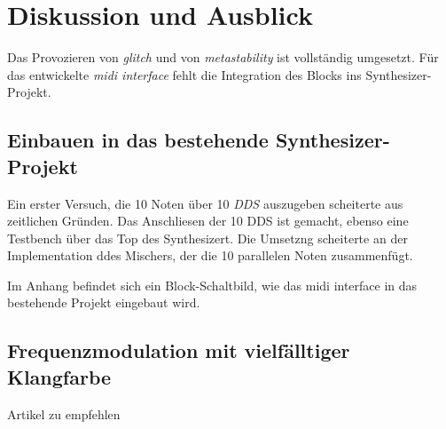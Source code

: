 
\chapter{Diskussion und Ausblick}\label{chap.diskussion}

Das Provozieren von \textit{glitch} und von \textit{metastability} ist vollständig umgesetzt. Für das entwickelte \textit{midi interface} fehlt die Integration des Blocks ins Synthesizer-Projekt. 

\section{Einbauen in das bestehende Synthesizer-Projekt}

Ein erster Versuch, die 10 Noten über 10 \textit{DDS} auszugeben scheiterte aus zeitlichen Gründen. Das Anschliesen der 10 DDS ist gemacht, ebenso eine Testbench über das Top des Synthesizert. Die Umsetzng scheiterte an der Implementation ddes Mischers, der die 10 parallelen Noten zusammenfügt.

Im Anhang befindet sich ein Block-Schaltbild, wie das midi interface in das bestehende Projekt eingebaut wird. 

\section{Frequenzmodulation mit vielfälltiger Klangfarbe}
Artikel zu empfehlen


